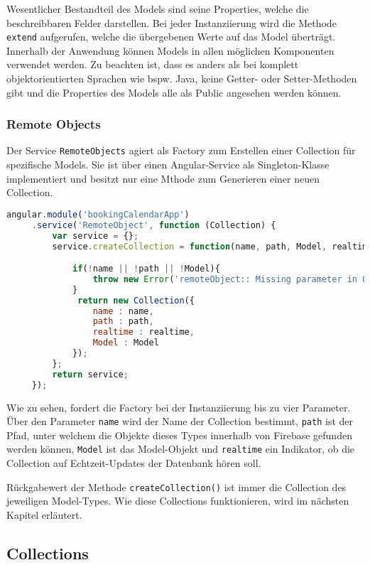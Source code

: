Wesentlicher Bestandteil des Models sind seine Properties, welche die beschreibbaren Felder darstellen. Bei jeder Instanziierung wird die Methode \texttt{extend\(\)} aufgerufen, welche die
übergebenen Werte auf das Model überträgt.
Innerhalb der Anwendung können Models in allen möglichen Komponenten verwendet werden. Zu beachten ist, dass es anders als bei komplett objektorientierten Sprachen wie bspw. Java,
keine Getter- oder Setter-Methoden gibt und die Properties des Models alle als Public angesehen werden können.


\subsubsection{Remote Objects}
Der Service \texttt{RemoteObjects} agiert als Factory zum Erstellen einer Collection für spezifische Models. Sie ist über einen Angular-Service als Singleton-Klasse implementiert und besitzt
 nur eine Mthode zum Generieren einer neuen Collection.

 \begin{lstlisting}[language=Javascript, label=code_RemoteObject, caption=Code des RemoteObjects-Service]
 angular.module('bookingCalendarApp')
     .service('RemoteObject', function (Collection) {
         var service = {};
         service.createCollection = function(name, path, Model, realtime){

             if(!name || !path || !Model){
                 throw new Error('remoteObject:: Missing parameter in Object')
             }
              return new Collection({
                 name : name,
                 path : path,
                 realtime : realtime,
                 Model : Model
             });
         };
         return service;
     });
\end{lstlisting}

Wie zu sehen, fordert die Factory bei der Instanziierung bis zu vier Parameter. Über den Parameter \texttt{name} wird der Name der Collection bestimmt, \texttt{path} ist der Pfad, unter welchem die Objekte dieses Types
innerhalb von Firebase gefunden werden können, \texttt{Model} ist das Model-Objekt und \texttt{realtime} ein Indikator, ob die Collection auf Echtzeit-Updates der Datenbank hören soll.

Rückgabewert der Methode \texttt{createCollection()} ist immer die Collection des jeweiligen Model-Types.
Wie diese Collections funktionieren, wird im nächsten Kapitel erläutert.

\subsection{Collections}


